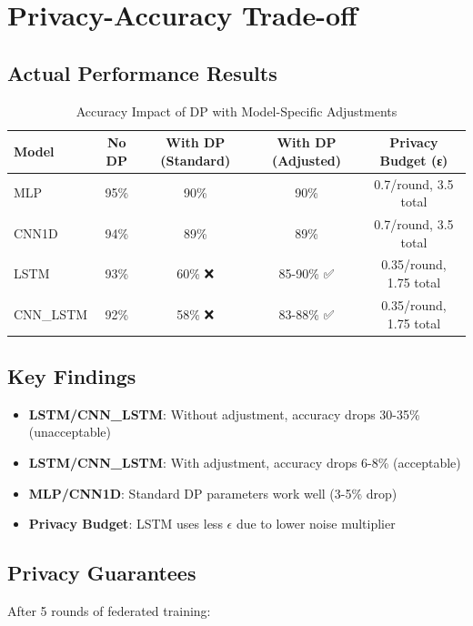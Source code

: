 \documentclass[12pt,a4paper]{article}
\begin{document}
\section{Privacy-Accuracy Trade-off}

\subsection{Actual Performance Results}

\begin{table}[h]
\centering
\begin{tabular}{@{}lcccc@{}}
\toprule
\textbf{Model} & \textbf{No DP} & \textbf{With DP (Standard)} & \textbf{With DP (Adjusted)} & \textbf{Privacy Budget (ε)} \\
\midrule
MLP & 95\% & 90\% & 90\% & 0.7/round, 3.5 total \\
CNN1D & 94\% & 89\% & 89\% & 0.7/round, 3.5 total \\
LSTM & 93\% & 60\% ❌ & 85-90\% ✅ & 0.35/round, 1.75 total \\
CNN\_LSTM & 92\% & 58\% ❌ & 83-88\% ✅ & 0.35/round, 1.75 total \\
\bottomrule
\end{tabular}
\caption{Accuracy Impact of DP with Model-Specific Adjustments}
\end{table}

\subsection{Key Findings}

\begin{itemize}
    \item \textbf{LSTM/CNN\_LSTM}: Without adjustment, accuracy drops 30-35\% (unacceptable)
    \item \textbf{LSTM/CNN\_LSTM}: With adjustment, accuracy drops 6-8\% (acceptable)
    \item \textbf{MLP/CNN1D}: Standard DP parameters work well (3-5\% drop)
    \item \textbf{Privacy Budget}: LSTM uses less $\epsilon$ due to lower noise multiplier
\end{itemize}

\subsection{Privacy Guarantees}

After 5 rounds of federated training:
\end{document}
